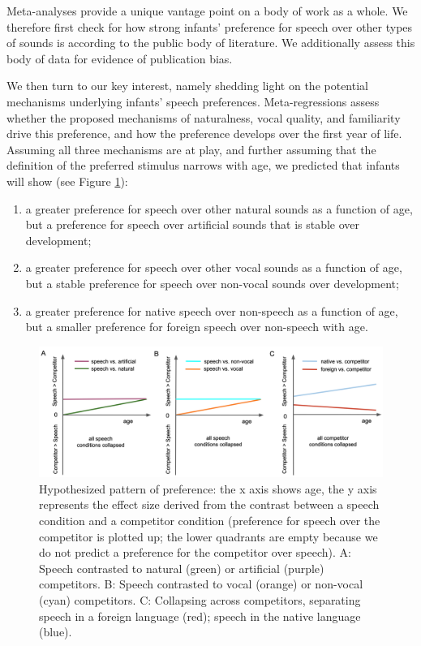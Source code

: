 \documentclass[
  english,
  man]{apa6}
\providecommand{\tightlist}{%
  \setlength{\itemsep}{0pt}\setlength{\parskip}{0pt}}
\begin{document}
Meta-analyses provide a unique vantage point on a body of work as a whole. We therefore first check for how strong infants' preference for speech over other types of sounds is according to the public body of literature. We additionally assess this body of data for evidence of publication bias.

We then turn to our key interest, namely shedding light on the potential mechanisms underlying infants' speech preferences. Meta-regressions assess whether the proposed mechanisms of naturalness, vocal quality, and familiarity drive this preference, and how the preference develops over the first year of life. Assuming all three mechanisms are at play, and further assuming that the definition of the preferred stimulus narrows with age, we predicted that infants will show (see Figure \ref{fig:hyp}):

\begin{enumerate}
\def\labelenumi{\arabic{enumi}.}
\tightlist
\item
  a greater preference for speech over other natural sounds as a function of age, but a preference for speech over artificial sounds that is stable over development;
\item
  a greater preference for speech over other vocal sounds as a function of age, but a stable preference for speech over non-vocal sounds over development;
\item
  a greater preference for native speech over non-speech as a function of age, but a smaller preference for foreign speech over non-speech with age.
\end{enumerate}

\begin{figure}
\includegraphics[width=6.63in]{figures_intro/hypotheses} \caption{Hypothesized pattern of preference: the x axis shows age, the y axis represents the effect size derived from the contrast between a speech condition and a competitor condition (preference for speech over the competitor is plotted up; the lower quadrants are empty because we do not predict a preference for the competitor over speech). A: Speech contrasted to natural (green) or artificial (purple) competitors. B: Speech contrasted to vocal (orange) or non-vocal (cyan) competitors. C: Collapsing across competitors, separating speech in a foreign language (red); speech in the native language (blue).}\label{fig:hyp}
\end{figure}
\end{document}
